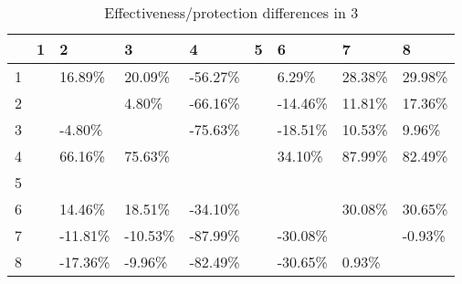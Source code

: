 \begin{table}[ht]
\centering
\begin{tabular}{rllllllll}
  \hline
 & 1 & 2 & 3 & 4 & 5 & 6 & 7 & 8 \\ 
  \hline
1 &  & 16.89\% & 20.09\% & -56.27\% &  & 6.29\% & 28.38\% & 29.98\% \\ 
  2 &  &  & 4.80\% & -66.16\% &  & -14.46\% & 11.81\% & 17.36\% \\ 
  3 &  & -4.80\% &  & -75.63\% &  & -18.51\% & 10.53\% & 9.96\% \\ 
  4 &  & 66.16\% & 75.63\% &  &  & 34.10\% & 87.99\% & 82.49\% \\ 
  5 &  &  &  &  &  &  &  &  \\ 
  6 &  & 14.46\% & 18.51\% & -34.10\% &  &  & 30.08\% & 30.65\% \\ 
  7 &  & -11.81\% & -10.53\% & -87.99\% &  & -30.08\% &  & -0.93\% \\ 
  8 &  & -17.36\% & -9.96\% & -82.49\% &  & -30.65\% & 0.93\% &  \\ 
   \hline
\end{tabular}
\caption{Effectiveness/protection differences in  3} 
\end{table}
